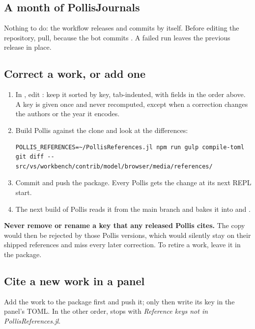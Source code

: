 \subsection{A month of PollisJournals}
Nothing to do: the workflow releases and commits by itself. Before editing the repository, pull, because the bot
commits . A failed run leaves the previous release in place.

\subsection{Correct a work, or add one}\label{sec:proc-refs}
\begin{enumerate}
  \item In , edit : keep it sorted by key, tab-indented, with
    fields in the order above. A key is given once and never recomputed, except when a correction changes the authors
    or the year it encodes.
  \item Build Pollis against the clone and look at the differences:
\begin{lstlisting}
POLLIS_REFERENCES=~/PollisReferences.jl npm run gulp compile-toml
git diff -- src/vs/workbench/contrib/model/browser/media/references/
\end{lstlisting}
  \item Commit and push the package. Every Pollis gets the change at its next REPL start.
  \item The next build of Pollis reads it from the main branch and bakes it into  and .
\end{enumerate}
\textbf{Never remove or rename a key that any released Pollis cites.} The copy would then be rejected by those Pollis
versions, which would silently stay on their shipped references and miss every later correction. To retire a work,
leave it in the package.

\subsection{Cite a new work in a panel}
Add the work to the package first and push it; only then write its key in the panel's TOML. In the other order,  stops with \emph{Reference keys not in PollisReferences.jl}.

